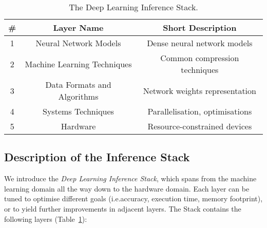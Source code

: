 \documentclass[conference]{IEEEtran}
\begin{document}
\begin{table}[t]
\begin{center}
\vspace{-0.3cm}
\caption{The Deep Learning Inference Stack.}
\begin{tabular}{ |c|c|c| } \hline
\bf{\#}&\bf{Layer Name} & \bf{Short Description} \\ \hline \hline
1&Neural Network Models & Dense neural network models \\ \hline
2&Machine Learning Techniques & Common compression techniques \\ \hline
3&Data Formats and Algorithms & Network weights representation \\ \hline
4&Systems Techniques & Parallelisation, optimisations \\ \hline
5&Hardware & Resource-constrained devices \\ \hline
\end{tabular}
\label{table:inference_stack}
\end{center}
\end{table}\subsection{Description of the Inference Stack}

We introduce the \textit{Deep Learning Inference Stack}, which spans from the machine learning domain all the way down to the hardware domain. Each layer can be tuned to optimise different goals (i.e.\inference accuracy, execution time, memory footprint), or to yield further improvements in adjacent layers. The Stack contains the following layers (Table~\ref{table:inference_stack}):
\end{document}
